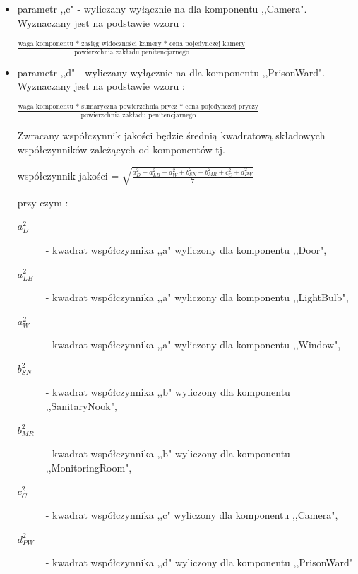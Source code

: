 \documentclass[10pt,oneside]{article}
\begin{document}
\begin{description}
\begin{itemize}
			\item parametr ,,c" - wyliczany wyłącznie na dla komponentu ,,Camera". Wyznaczany jest na podstawie wzoru :
			\begin{center}
				$\frac{\text{waga komponentu * zasięg widoczności kamery * cena pojedynczej kamery}}{\text{powierzchnia zakładu penitencjarnego}}$
			\end{center}
		
			\item parametr ,,d" - wyliczany wyłącznie na dla komponentu ,,PrisonWard". Wyznaczany jest na podstawie wzoru :
			\begin{center}
				$\frac{\text{waga komponentu * sumaryczna powierzchnia prycz * cena pojedynczej pryczy}}{\text{powierzchnia zakładu penitencjarnego}}$
			\end{center}
		
			Zwracany współczynnik jakości będzie średnią kwadratową składowych współczynników zależących od komponentów tj.
			\begin{center}
				współczynnik jakości = $\sqrt{\frac{a_{D}^{2} + a_{LB}^{2} + a_{W}^{2} + b_{SN}^{2} + b_{MR}^{2} + c_{C}^{2} + d_{PW}^{2}}{7}}$
			\end{center}
			przy czym : 
			\begin{description}
				\item[$a_{D}^{2}$] - kwadrat współczynnika ,,a" wyliczony dla komponentu ,,Door",
				\item[$a_{LB}^{2}$] - kwadrat współczynnika ,,a" wyliczony dla komponentu ,,LightBulb",
				\item[$a_{W}^{2}$] - kwadrat współczynnika ,,a" wyliczony dla komponentu ,,Window",
				\item[$b_{SN}^{2}$] - kwadrat współczynnika ,,b" wyliczony dla komponentu ,,SanitaryNook",
				\item[$b_{MR}^{2}$] - kwadrat współczynnika ,,b" wyliczony dla komponentu ,,MonitoringRoom",
				\item[$c_{C}^{2}$] - kwadrat współczynnika ,,c" wyliczony dla komponentu ,,Camera",
				\item[$d_{PW}^{2}$] - kwadrat współczynnika ,,d" wyliczony dla komponentu ,,PrisonWard"
			\end{description}
		
		
		\end{itemize}
		
	\end{description}
	
\end{document}
